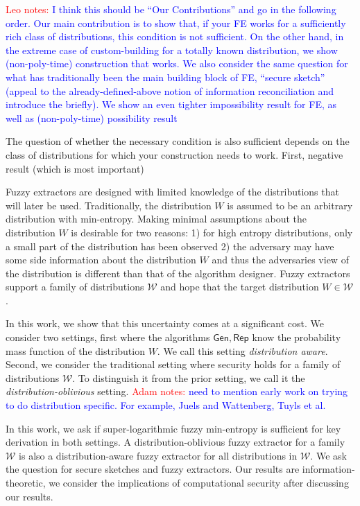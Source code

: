 \documentclass[11pt]{article}
\newcommand{\class}[1]{{\ensuremath{\mathsf{#1}}}}
\newcommand{\gen}{\ensuremath{\class{Gen}}\xspace}
\newcommand{\rep}{\ensuremath{\class{Rep}}\xspace}
\newcommand{\authnote}[2]{{\textcolor{red}{\textsf{#1 notes: }\textcolor{blue}{ #2}}\marginpar{\textcolor{red}{\textbf{!!!!!}}}}}
\newcommand{\authnote}[2]{}
\newcommand{\lnote}[1]{{\authnote{Leo}{#1}}}
\newcommand{\anote}[1]{{\authnote{Adam}{#1}}}
\begin{document}
\lnote{I think this should be ``Our Contributions'' and go in the following order. Our main contribution is to show that, if your FE works for a sufficiently rich class of distributions, this condition is not sufficient. On the other hand, in the extreme case of custom-building for a totally known distribution, we show (non-poly-time) construction that works. We also consider the same question for what has traditionally been the main building block of FE, ``secure sketch'' (appeal to the already-defined-above notion of information reconciliation and introduce the briefly). We show an even tighter impossibility result for FE, as well as (non-poly-time) possibility result}

The question of whether the necessary condition is also sufficient depends on the class of distributions for which your construction needs to work. First, negative result (which is most important)


Fuzzy extractors are designed with limited knowledge of the distributions that will later be used.  Traditionally, the distribution $W$ is assumed to be an arbitrary distribution with min-entropy.  Making minimal assumptions about the distribution $W$ is desirable for two reasons: 1) for high entropy distributions, only a small part of the distribution has been observed 2) the adversary may have some side information about the distribution $W$ and thus the adversaries view of the distribution is different than that of the algorithm designer.  Fuzzy extractors support a family of distributions $\mathcal{W}$ and hope that the target distribution $W\in\mathcal{W}$.

In this work, we show that this uncertainty comes at a significant cost.  We consider two settings, first where the algorithms $\gen, \rep$ know the probability mass function of the distribution $W$.  We call this setting \emph{distribution aware}.  Second, we consider the traditional setting where security holds for a family of distributions $\mathcal{W}$.  To distinguish it from the prior setting, we call it the \emph{distribution-oblivious} setting.
\anote{need to mention early work on trying to do distribution specific. For example, Juels and Wattenberg, Tuyls et al.}


In this work, we ask if super-logarithmic fuzzy min-entropy is sufficient for key derivation in both settings.  A distribution-oblivious fuzzy extractor for a family $\mathcal{W}$ is also a distribution-aware fuzzy extractor for all distributions in $\mathcal{W}$.   We ask the question for secure sketches and fuzzy extractors.  Our results are information-theoretic, we consider the implications of computational security after discussing our results.
\end{document}
